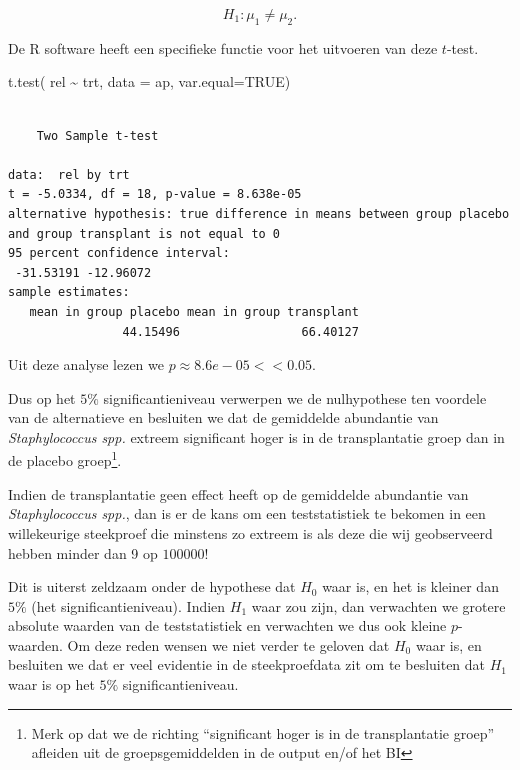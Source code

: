 \documentclass[
  dutch,
  letterpaper,
  12pt]{book}
\newenvironment{Shaded}{\begin{snugshade}}{\end{snugshade}}
\newcommand{\AttributeTok}[1]{\textcolor[rgb]{0.40,0.45,0.13}{#1}}
\newcommand{\ConstantTok}[1]{\textcolor[rgb]{0.56,0.35,0.01}{#1}}
\newcommand{\FunctionTok}[1]{\textcolor[rgb]{0.28,0.35,0.67}{#1}}
\newcommand{\NormalTok}[1]{\textcolor[rgb]{0.00,0.23,0.31}{#1}}
\newcommand{\SpecialCharTok}[1]{\textcolor[rgb]{0.37,0.37,0.37}{#1}}
\theoremstyle{definition}
\theoremstyle{definition}
\theoremstyle{definition}
\theoremstyle{remark}
\begin{document}
\[H_1: \mu_1\neq \mu_2.\]

De R software heeft een specifieke functie voor het uitvoeren van deze
\(t\)-test.

\begin{Shaded}
\begin{Highlighting}[]
\FunctionTok{t.test}\NormalTok{(}
\NormalTok{    rel }\SpecialCharTok{\textasciitilde{}}\NormalTok{ trt,}
    \AttributeTok{data =}\NormalTok{ ap,}
    \AttributeTok{var.equal=}\ConstantTok{TRUE}\NormalTok{)}
\end{Highlighting}
\end{Shaded}

\begin{verbatim}

    Two Sample t-test

data:  rel by trt
t = -5.0334, df = 18, p-value = 8.638e-05
alternative hypothesis: true difference in means between group placebo and group transplant is not equal to 0
95 percent confidence interval:
 -31.53191 -12.96072
sample estimates:
   mean in group placebo mean in group transplant 
                44.15496                 66.40127 
\end{verbatim}

Uit deze analyse lezen we \(p\approx 8.6e-05<<0.05\).

Dus op het \(5\%\) significantieniveau verwerpen we de nulhypothese ten
voordele van de alternatieve en besluiten we dat de gemiddelde
abundantie van \emph{Staphylococcus spp.} extreem significant hoger is
in de transplantatie groep dan in de placebo groep\footnote{Merk op dat
  we de richting ``significant hoger is in de transplantatie groep''
  afleiden uit de groepsgemiddelden in de output en/of het BI}.

Indien de transplantatie geen effect heeft op de gemiddelde abundantie
van \emph{Staphylococcus spp.}, dan is er de kans om een teststatistiek
te bekomen in een willekeurige steekproef die minstens zo extreem is als
deze die wij geobserveerd hebben minder dan 9 op \(100000\)!

Dit is uiterst zeldzaam onder de hypothese dat \(H_0\) waar is, en het
is kleiner dan \(5\%\) (het significantieniveau). Indien \(H_1\) waar
zou zijn, dan verwachten we grotere absolute waarden van de
teststatistiek en verwachten we dus ook kleine \(p\)-waarden. Om deze
reden wensen we niet verder te geloven dat \(H_0\) waar is, en besluiten
we dat er veel evidentie in de steekproefdata zit om te besluiten dat
\(H_1\) waar is op het \(5\%\) significantieniveau.
\end{document}

